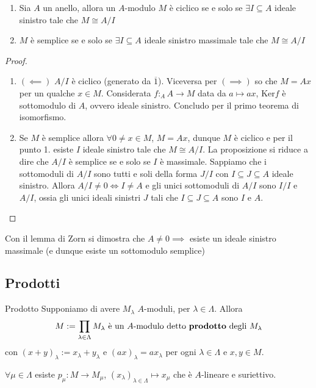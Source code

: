 \begin{proposition}{} \( \) 
\begin{enumerate}[label = \arabic*.]
    \item Sia \(A\) un anello, allora un \(A\)-modulo \(M\) è ciclico se e solo se \(\exists I \subseteq A \) ideale sinistro tale che \(M \cong A / I\) 
    \item \(M\) è semplice se e solo se \(\exists  I \subseteq A \) ideale
        sinistro massimale tale che \(M \cong A/I\) 
\end{enumerate}
\end{proposition}
\begin{proof}{}
\begin{enumerate}[label = \arabic*.]
    \item \({(\impliedby)}\) \(A / I\) è ciclico (generato da \(\overline{1}\)). Viceversa per \({(\implies )}\) so che \(M = Ax\) per un qualche \(x \in M\). Considerata \(
        f : _AA \to M\) data da \(a \mapsto ax\), \(\mathrm{Ker}f\) è
        sottomodulo di \(A\), ovvero ideale sinistro. Concludo per il primo
        teorema di isomorfismo.
    \item Se \(M\) è semplice allora \(\forall 0 \neq x \in M\), \(M = Ax\),
        dunque \(M\) è ciclico e per il punto 1. esiste \(I\) ideale sinistro
        tale che \(M \cong A/I\). La proposizione si riduce a dire che \(A/I\) è
        semplice se e solo se \(I\) è massimale. Sappiamo che i sottomoduli di
        \(A/I\) sono tutti e soli della forma \(J /I\) con \(I \subseteq J \subseteq A  \) ideale sinistro.
        Allora \(A / I \neq 0 \iff I \neq A\) e gli unici sottomoduli di \(A / I \) sono \(I / I\) e \(A / I\), ossia gli unici ideali sinistri \(J\) tali che \(I \subseteq J \subseteq A  \) sono \(I\) e \(A\).
\end{enumerate}
\end{proof}
\begin{remark}{}
    Con il lemma di Zorn si dimostra che \(A \neq 0 \implies \) esiste un ideale
    sinistro massimale (e dunque esiste un sottomodulo semplice)
\end{remark}

\subsection{Prodotti}
\begin{definition}{Prodotto}
Supponiamo di avere \(M_{\lambda} \) \(A\)-moduli, per \(\lambda \in \Lambda\). Allora 
\[
  M := \prod_{\lambda \in \Lambda} M_{\lambda} \text{ è un \(A\)-modulo detto \textbf{prodotto} degli \(M_{\lambda}\)}
\]
con \({(x + y)}_\lambda := x_\lambda + y_\lambda\)  e \({(ax)}_\lambda =
ax_\lambda\) per ogni \(\lambda \in \Lambda\) e \(x, y \in M\).

\(\forall \mu \in \Lambda\) esiste \(p_\mu : M \to M_\mu\), \({(x_{\lambda})}_{\lambda \in \Lambda} \mapsto x_\mu  \) che è \(A\)-lineare e suriettivo.
\end{definition}

